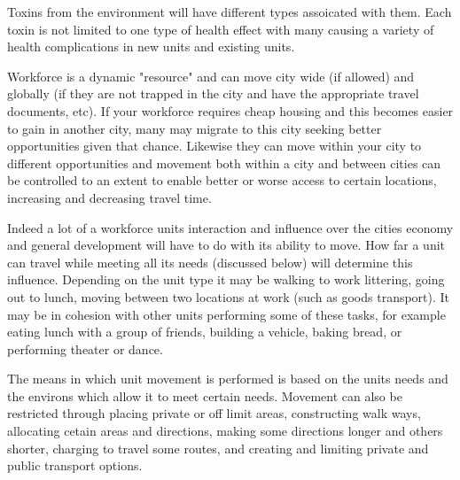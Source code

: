 Toxins from the environment will have different types assoicated with them. Each toxin is not limited to one type of health effect with many causing a variety of health complications in new units and existing units.   



Workforce is a dynamic "resource" and can move city wide (if allowed) and globally (if they are not trapped in the city and have the appropriate travel documents, etc). If your workforce requires cheap housing and this becomes easier to gain in another city, many may migrate to this city seeking better opportunities given that chance. Likewise they can move within your city to different opportunities and movement both within a city and between cities can be controlled to an extent to enable better or worse access to certain locations, increasing and decreasing travel time.

Indeed a lot of a workforce units interaction and influence over the cities economy and general development will have to do with its ability to move. How far a unit can travel while meeting all its needs (discussed below) will determine this influence. Depending on the unit type it may be walking to work littering, going out to lunch, moving between two locations at work (such as goods transport). It may be in cohesion with other units performing some of these tasks, for example eating lunch with a group of friends, building a vehicle, baking bread, or performing theater or dance. 

The means in which unit movement is performed is based on the units needs and the environs which allow it to meet certain needs. Movement can also be restricted through placing private or off limit areas, constructing walk ways, allocating cetain areas and directions, making some directions longer and others shorter, charging to travel some routes, and creating and limiting private and public transport options. 





